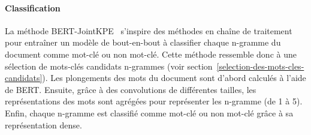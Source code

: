 \paragraph{Classification}
La méthode BERT-JointKPE~\cite{sun_joint_2020} s'inspire des méthodes en chaîne de traitement pour entraîner un modèle de bout-en-bout à classifier chaque n-gramme du document comme mot-clé ou non mot-clé. Cette méthode ressemble donc à une sélection de mots-clés candidats n-grammes (voir section~\ref{selection-des-mots-cles-candidats}).
Les plongements des mots du document sont d'abord calculés à l'aide de BERT. Ensuite, grâce à des convolutions de différentes tailles, les représentations des mots sont agrégées pour représenter les n-gramme (de 1 à 5).
Enfin, chaque n-gramme est classifié comme mot-clé ou non mot-clé grâce à sa représentation dense.

